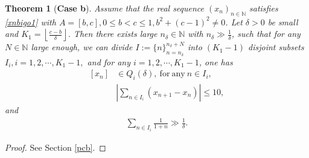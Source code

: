 \documentclass[12pt]{amsart}
\newcommand{\abs}[1]{\left\lvert #1 \right\rvert}
\theoremstyle{plain}
\newtheorem{theorem}{Theorem}[section]
\theoremstyle{definition}
\begin{document}
\begin{theorem}[\textbf{Case b}]\label{caseb}
	Assume that the real sequence $(x_n)_{n\in\mathbb{N}}$ satisfies \eqref{xnbigo1} with $A=[b,c],0\leq b<c\leq 1, b^2+(c-1)^2\neq 0$. Let $\delta>0$ be small and $K_1=\left \lfloor \frac{c-b}{\delta} \right \rfloor$. Then there exists large $n_\delta\in\mathbb{N}$ with $n_\delta\gg \frac{1}{\delta}$, such that for any $N\in\mathbb{N}$ large enough, we can divide $I:=\{n\}_{n=n_\delta}^{n_\delta+N}$ into $(K_1-1)$ disjoint subsets $I_i, i=1,2,\cdots,K_1-1,$ and for any $i=1,2,\cdots,K_1-1$, one has
	\begin{align}
		{[x_n]}&\in Q_i(\delta),\ \mathrm{for\ any}\ n\in I_i,\label{aiinvi}\\
		&\abs{\sum_{n\in I_i}(x_{n+1}-x_n)}\leq 10,\label{Iileq10}
	\end{align}
	and 
	\begin{align}
		\sum_{n\in I_i}\frac{1}{1+n}\gg \frac{1}{\delta}.\label{Iifractionlargecasec}
	\end{align}
\end{theorem}
\begin{proof}
	See Section \ref{pcb}.
\end{proof}
\end{document}
